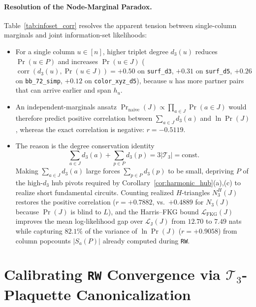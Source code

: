 \documentclass[12pt]{article}
\theoremstyle{definition}
\newcommand{\Tc}{\mathcal{T}_3}
\newcommand{\LH}{\mathcal{L}_{\mathrm{J}}}
\newcommand{\LFKG}{\mathcal{L}_{\mathrm{FKG}}}
\newcommand{\ttt}[1]{\texttt{#1}}
\begin{document}
\paragraph{Resolution of the Node-Marginal Paradox.}
Table~\ref{tab:infoset_corr} resolves the apparent tension between single-column marginals and joint information-set
likelihoods:
\begin{itemize}
  \item For a single column $u \in [n]$, higher triplet degree $d_3(u)$ reduces $\Pr(u \in P)$ and increases $\Pr(u
    \in J)$ ($\operatorname{corr}(d_3(u), \Pr(u \in J)) = +0.50$ on \ttt{surf\_d3}, $+0.31$ on \ttt{surf\_d5},
    $+0.26$ on \ttt{bb\_72\_simp}, $+0.12$ on \ttt{color\_xyz\_d5}), because $u$ has more partner pairs that can
    arrive earlier and span $h_u$.
  \item An independent-marginals ansatz $\Pr_{\mathrm{naive}}(J) \propto \prod_{a \in J} \Pr(a \in J)$ would
    therefore predict positive correlation between $\sum_{a \in J} d_3(a)$ and $\ln \Pr(J)$, whereas the exact
    correlation is negative: $r = -0.5119$.
  \item The reason is the degree conservation identity
    \begin{equation}\label{eq:d3_sum_rule}
      \sum_{a \in J} d_3(a) + \sum_{p \in P} d_3(p) = 3|\Tc| = \text{const}.
    \end{equation}
    Making $\sum_{a \in J} d_3(a)$ large forces $\sum_{p \in P} d_3(p)$ to be small, depriving $P$ of the high-$d_3$
    hub pivots required by Corollary~\ref{cor:harmonic_hub}(a),(c) to realize short fundamental circuits. Counting
    realized $H$-triangles $N_3^H(J)$ restores the positive correlation ($r = +0.7882$, vs.\ $+0.4889$ for $N_3(J)$
    because $\Pr(J)$ is blind to $L$), and the Harris--FKG bound $\LFKG(J)$ improves the mean log-likelihood gap
    over $\LH(J)$ from $12.70$ to $7.49$ nats while capturing $82.1\%$ of the variance of $\ln \Pr(J)$ ($r =
    +0.9058$) from column popcounts $|S_a(P)|$ already computed during \ttt{RW}.
\end{itemize}

\section{Calibrating \texorpdfstring{\ttt{RW}}{RW} Convergence via \texorpdfstring{$\Tc$}{T3}-Plaquette
  Canonicalization}\label{sec:convergence}
\end{document}
